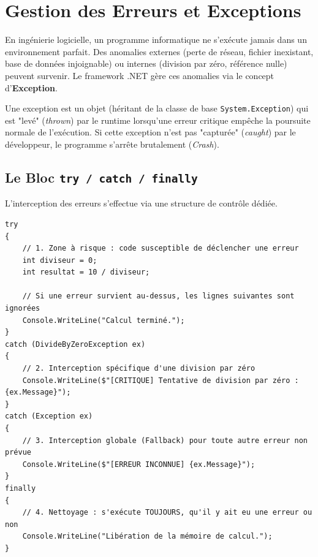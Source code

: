 
\newpage
\section{Gestion des Erreurs et Exceptions}

En ingénierie logicielle, un programme informatique ne s'exécute jamais dans un environnement parfait. Des anomalies externes (perte de réseau, fichier inexistant, base de données injoignable) ou internes (division par zéro, référence nulle) peuvent survenir. Le framework .NET gère ces anomalies via le concept d'\textbf{Exception}. 

Une exception est un objet (héritant de la classe de base \texttt{System.Exception}) qui est "levé" (\textit{thrown}) par le runtime lorsqu'une erreur critique empêche la poursuite normale de l'exécution. Si cette exception n'est pas "capturée" (\textit{caught}) par le développeur, le programme s'arrête brutalement (\textit{Crash}).

\subsection{Le Bloc \texttt{try / catch / finally}}

L'interception des erreurs s'effectue via une structure de contrôle dédiée.

\begin{lstlisting}[style=csharpstyle]
try
{
    // 1. Zone à risque : code susceptible de déclencher une erreur
    int diviseur = 0;
    int resultat = 10 / diviseur; 
    
    // Si une erreur survient au-dessus, les lignes suivantes sont ignorées
    Console.WriteLine("Calcul terminé.");
}
catch (DivideByZeroException ex)
{
    // 2. Interception spécifique d'une division par zéro
    Console.WriteLine($"[CRITIQUE] Tentative de division par zéro : {ex.Message}");
}
catch (Exception ex)
{
    // 3. Interception globale (Fallback) pour toute autre erreur non prévue
    Console.WriteLine($"[ERREUR INCONNUE] {ex.Message}");
}
finally
{
    // 4. Nettoyage : s'exécute TOUJOURS, qu'il y ait eu une erreur ou non
    Console.WriteLine("Libération de la mémoire de calcul.");
}
\end{lstlisting}


